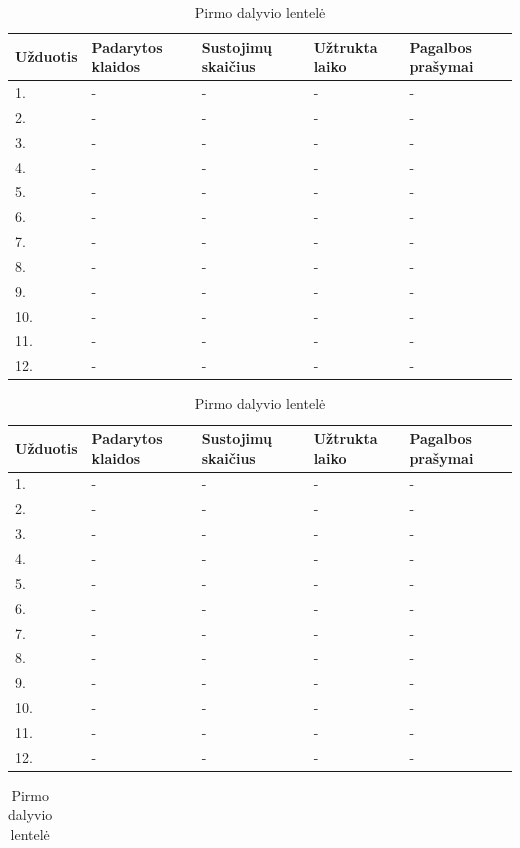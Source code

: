 \documentclass[oneside]{VUMIFPSkursinis}
\begin{document}
\begin{center}
	\begin{table}[!pht]
	\caption{Pirmo dalyvio lentelė}
	\begin{tabular}{ |p{1.8cm} | p{3.4cm} | p{3.4cm} | p{2.5cm} | p{3.5cm}|}
	\hline
	Užduotis&Padarytos klaidos&Sustojimų skaičius&Užtrukta laiko&Pagalbos prašymai\\ \hline
1.&-&-&-&- \\ \hline
2.&-&-&-&- \\ \hline
3.&-&-&-&- \\ \hline
4.&-&-&-&- \\ \hline
5.&-&-&-&- \\ \hline
6.&-&-&-&- \\ \hline
7.&-&-&-&- \\ \hline
8.&-&-&-&- \\ \hline
9.&-&-&-&- \\ \hline
10.&-&-&-&- \\ \hline
11.&-&-&-&- \\ \hline
12.&-&-&-&- \\ \hline
\end{tabular}
\end{table}
\vspace{0.7cm}
	\begin{table}[!pht]
	\caption{Pirmo dalyvio lentelė}
	\begin{tabular}{ |p{1.8cm} | p{3.4cm} | p{3.4cm} | p{2.5cm} | p{3.5cm}|}
	\hline
	Užduotis&Padarytos klaidos&Sustojimų skaičius&Užtrukta laiko&Pagalbos prašymai\\ \hline
1.&-&-&-&- \\ \hline
2.&-&-&-&- \\ \hline
3.&-&-&-&- \\ \hline
4.&-&-&-&- \\ \hline
5.&-&-&-&- \\ \hline
6.&-&-&-&- \\ \hline
7.&-&-&-&- \\ \hline
8.&-&-&-&- \\ \hline
9.&-&-&-&- \\ \hline
10.&-&-&-&- \\ \hline
11.&-&-&-&- \\ \hline
12.&-&-&-&- \\ \hline
\end{tabular}
\end{table}
\vspace{0.7cm}
	\begin{table}[!pht]
	\caption{Pirmo dalyvio lentelė}
	\begin{tabular}{ |p{1.8cm} | p{3.4cm} | p{3.4cm} | p{2.5cm} | p{3.5cm}|}

\end{tabular}
\end{table}
\end{center}
\end{document}

